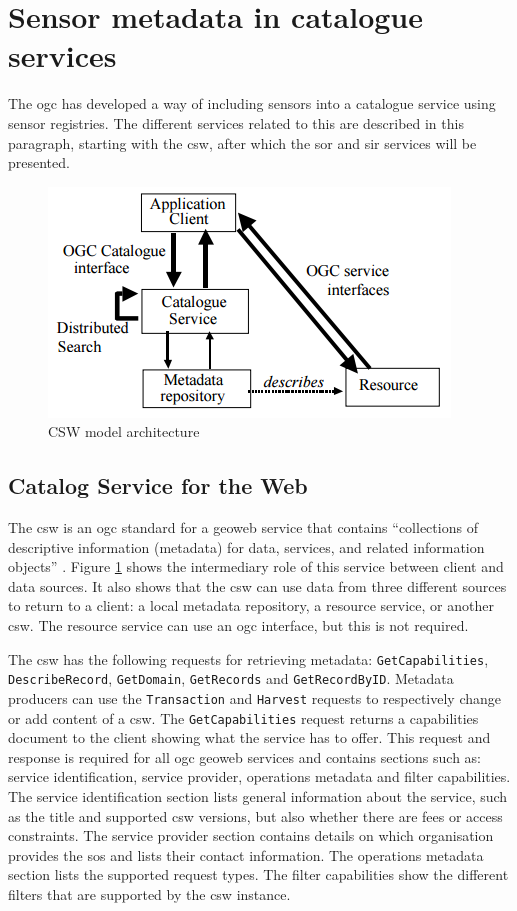 \section{Sensor metadata in catalogue services}
The \ac{ogc} has developed a way of including sensors into a catalogue service using sensor registries. The different services related to this are described in this paragraph, starting with the \acf{csw}, after which the \acf{sor} and \acf{sir} services will be presented.

\begin{figure}
	\centering
	\includegraphics[width=0.6\linewidth]{UML/CSW.png}
	\caption{CSW model architecture \citep[p. 26]{GEO:OGC2}}
	\label{fig:CSW}
\end{figure}

\subsection{Catalog Service for the Web}
\label{par:CSW}
 The \ac{csw} is an \ac{ogc} standard for a geoweb service that contains \enquote{collections of descriptive information (metadata) for data, services, and related information objects} \citep[p. xiv]{GEO:OGC2}. Figure \ref{fig:CSW} shows the intermediary role of this service between client and data sources. It also shows that the \ac{csw} can use data from three different sources to return to a client: a local metadata repository, a resource service, or another \ac{csw}. The resource service can use an \ac{ogc} interface, but this is not required. 
 
 \begin{sloppypar}
 The \ac{csw} has the following requests for retrieving metadata: \texttt{GetCapabilities},  \texttt{DescribeRecord}, \texttt{GetDomain}, \texttt{GetRecords} and \texttt{GetRecordByID}. Metadata producers can use the \texttt{Transaction} and \texttt{Harvest} requests to respectively change or add content of a \ac{csw}. The \texttt{GetCapabilities} request returns a capabilities document to the client showing what the service has to offer. This request and response is required for all \ac{ogc} geoweb services and contains sections such as: service identification, service provider, operations metadata and filter capabilities. The service identification section lists general information about the service, such as the title and supported \ac{csw} versions, but also whether there are fees or access constraints. The service provider section contains details on which organisation provides the \ac{sos} and lists their contact information. The operations metadata section lists the supported request types. The filter capabilities show the different filters that are supported by the \ac{csw} instance. 
\end{sloppypar}

